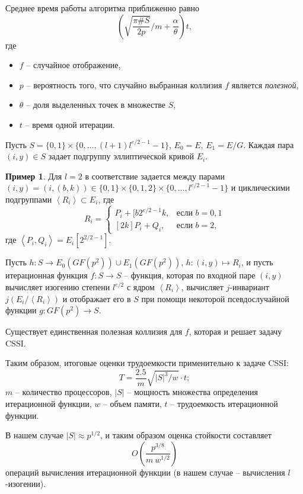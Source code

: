 \documentclass[a4paper,12pt]{article}
\newcommand{\tr}[1]{\left\langle #1\right\rangle}
\theoremstyle{definition}
\newtheorem{example}{Пример}
\begin{document}
Среднее время работы алгоритма приближенно равно
$$
\left(\sqrt{\frac{\pi\#S}{2p}}/m+\frac{\alpha}{\theta}\right)t,
$$
где
\begin{itemize}
\item $f$ -- случайное отображение,
\item $p$ -- вероятность того, что случайно выбранная коллизия $f$ является \emph{полезной},
\item $\theta$ -- доля выделенных точек в множестве $S$,
\item $t$ -- время одной итерации.
\end{itemize}

Пусть $S=\{0,1\}\times\{0,\dots,(l+1)l^{e/2-1}-1\}$, $E_0=E$, $E_1=E/G$.  Каждая пара $(i,y)\in S$ задает подгруппу эллиптической кривой $E_i$. 
\begin{example}
 Для $l=2$ в \cite{Adj} соответствие задается между парами $(i,y)=(i,(b,k))\in\{0,1\}\times\{0,1,2\}\times \{0,\dots,l^{e/2-1}-1\}$ и 
 циклическими подгруппами $\tr{R_i}\subset E_i$, где
 \begin{equation*}
R_i = 
 \begin{cases}
   P_i+[b2^{e/2-1}k,  &\text{если } b=0,1 \\
   [2k]P_i+Q_i,  &\text{если } b=2,
 \end{cases}
\end{equation*}
где $\tr{P_i,Q_i} = E_i[2^{2/2-1}]$.
\end{example}

Пусть $h:S\to E_0(GF(p^2))\cup E_1(GF(p^2))$, $h:(i,y)\mapsto R_i$, и  пусть итерационная функция $f:S\to S$ -- функция, которая по входной паре $(i,y)$
вычисляет изогению степени $l^{e/2}$ с ядром $\tr{R_i}$, вычисляет $j$-инвариант $j(E_i/\tr{R_i})$ и отображает его в $S$ при помощи некоторой псевдослучайной
функции $g: GF(p^2)\to S$.

Существует единственная полезная коллизия для $f$, которая и решает задачу CSSI.

Таким образом, итоговые оценки трудоемкости применительно к задаче CSSI:
\begin{equation}
T=\frac{2.5}{m}\sqrt{|S|^3/w}\cdot t;
\end{equation}
$m$ -- количество процессоров, $|S|$ -- мощность множества определения итерационной функции, $w$ -- объем памяти, $t$ -- трудоемкость итерационной функции.

В нашем случае $|S|\approx p^{1/2}$, и таким образом оценка стойкости составляет
\begin{equation} 
O\left(\frac{p^{3/8}}{m\ w^{1/2}}\right)
\end{equation}
операций вычисления итерационной функции (в нашем случае -- вычисления $l$-изогении).
\end{document}
